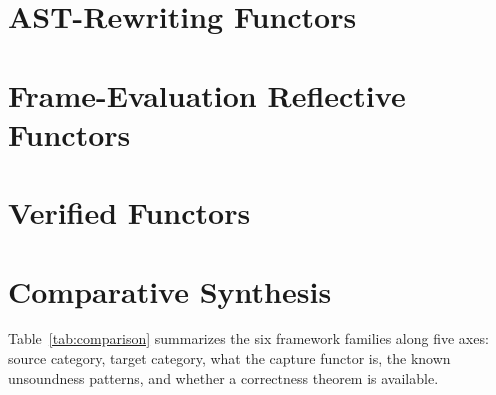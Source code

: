 \documentclass[11pt]{report}
\theoremstyle{definition}
\begin{document}
\begin{mainf}
\section{AST-Rewriting Functors}
\label{sec:litreview-ast-rewriting}


\section{Frame-Evaluation Reflective Functors}
\label{sec:litreview-bytecode}


\section{Verified Functors}
\label{sec:litreview-verified}


\section{Comparative Synthesis}
\label{sec:litreview-synthesis}

Table~\ref{tab:comparison} summarizes the six framework families along five
axes: source category, target category, what the capture functor is, the
known unsoundness patterns, and whether a correctness theorem is available.


\end{mainf}
\end{document}

